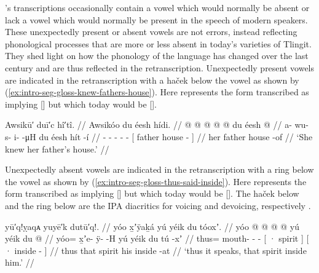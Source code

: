 \citeauthor{swanton:1909}’s transcriptions occasionally contain a vowel which would normally be absent or lack a vowel which would normally be present in the speech of modern speakers.
These unexpectedly present or absent vowels are not errors, instead reflecting phonological processes that are more or less absent in today’s varieties of Tlingit.
They shed light on how the phonology of the language has changed over the last century and are thus reflected in the retranscription.
Unexpectedly present vowels are indicated in the retranscription with a haček below the vowel as shown by (\ref{ex:intro-seg-gloss-knew-fathers-house}).
Here  represents the form \citeauthor{swanton:1909} transcribed as  implying  [] but which today would be  [].

\ex\label{ex:intro-seg-gloss-knew-fathers-house}%
%
\begingl
	\glpreamble	Awsikū′ duī′c hî′tî. //
	\glpreamble	Awsikóo du éesh hídi. //
	\gla	{} @ {} @ {} @ {} @ {} @ {}
		{} du éesh  @ {} {} //
	\glb	a- wu- s- i-  -μH
		{} du éesh hít -í {} //
	\glc	{}- - - -  -
		{}[  father house - {}] //
	\gld	{} {} {} {} {} {}
		{} her father house -of {} //
	\glft	‘She knew her father’s house.’
		//
\endgl
\xe

Unexpectedly absent vowels are indicated in the retranscription with a ring below the vowel as shown by (\ref{ex:intro-seg-gloss-thus-said-inside}).
Here  represents the form \citeauthor{swanton:1909} transcribed as  implying  [] but which today would be  [].
The haček below  and the ring below  are the IPA diacritics for voicing and devoicing, respectively \parencites{international-phonetic-association:1999}{international-phonetic-association:2018}.

\ex\label{ex:intro-seg-gloss-thus-said-inside}%
%
\begingl
	\glpreamble	yū′q!ỵaqᴀ yuyē′k dutū′q!. //
	\glpreamble	yóo x̱ʼÿaḵá yú yéik du tóoxʼ. //
	\gla	yóo @  @ {} @ {} @ {}
		{} yú yéik {}
		{} du  @ {} {} //
	\glb	yóo= x̱ʼe- ÿ-  -H
		{} yú yéik {}
		{} du tú -xʼ {} //
	\glc	thus= mouth- -  -
		{}[ · spirit {}]
		{}[ · inside - {}] //
	\gld	thus  {} {} {}
		{} that spirit {}
		{} his inside -at {} //
	\glft	‘thus it speaks, that spirit inside him.’
		//
\endgl
\xe

